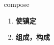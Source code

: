 
\begin{frame}
{\huge compose}
\begin{center}
\begin{enumerate}\Large
  \item \textbf{使镇定}
  \item \textbf{组成，构成}
\end{enumerate}
\end{center}
\end{frame}
